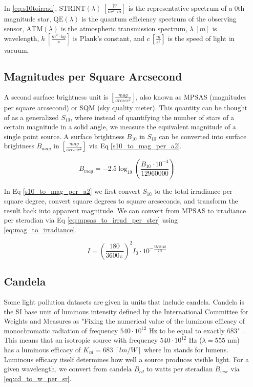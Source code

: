 In \ref{eq:s10toirrad}, $\textrm{STRINT}(\lambda) \: \left[ \frac{W}{m^2 \cdot m} \right]$ is the
representative spectrum of a 0th magnitude star, $\textrm{QE}(\lambda)$ is the quantum efficiency
spectrum of the observing sensor, $\textrm{ATM}(\lambda)$ is the atmospheric transmission spectrum, $\lambda \: [m]$ is wavelength, $h \: \left[
\frac{m^2 \cdot kg}{s} \right]$ is Plank's constant, and $c \: \left[ \frac{m}{s^2} \right]$ is the
speed of light in vacuum. 

\subsection{Magnitudes per Square Arcsecond}

A second surface brightness unit is $\left[ \frac{mag}{arcsec^2} \right]$, also known as MPSAS (magnitudes per square arcsecond) or SQM (sky quality meter). This quantity can be thought of as a generalized $S_{10}$, where instead of quantifying the number of stars of a certain
magnitude in a solid angle, we measure the equivalent magnitude of a single point source. A surface
brightness $B_{10}$ in $S_{10}$ can be converted into surface brightness $B_{mag}$ in 
$\left[ \frac{mag}{arcsec^2} \right]$ via Eq \ref{s10_to_mag_per_a2}.

\begin{equation} \label{s10_to_mag_per_a2}
	B_{mag} = -2.5 \log_{10}\left( \frac{B_{10} \cdot 10^{-4}}{12960000} \right)
\end{equation}

In Eq \ref{s10_to_mag_per_a2} we first convert $S_{10}$ to the total irradiance per square degree,
convert square degrees to square arcseconds, and transform the result back into apparent magnitude. We can convert from MPSAS to irradiance per steradian via Eq \ref{eq:mpsas_to_irrad_per_ster} using \ref{eq:mag_to_irradiance}.

\begin{equation} \label{eq:mpsas_to_irrad_per_ster}
  I = \left( \frac{180}{ 3600\pi} \right)^2 I_0 \cdot 10^{-\frac{MPSAS}{2.5}}
\end{equation}

\subsection{Candela} \label{sec:candela}

Some light pollution datasets are given in units that include candela. Candela is the SI base unit of luminous intensity defined by the International Committee for Weights and Measures as "Fixing the numerical value of the luminous efficacy of monochromatic radiation of frequency $540\cdot10^{12}$ Hz to be equal to exactly $683$" \cite{nist_units}. This means that an isotropic source with frequency $540\cdot10^{12}$ Hz ($\lambda = 555$ nm) has a luminous efficacy of $K_{cd} = 683 \: \left[ lm/W \right]$ where lm stands for lumens. Luminous efficacy itself determines how well a source produces visible light. For a given wavelength, we convert from candela $B_{cd}$ to watts per steradian $B_{wsr}$ via \ref{eq:cd_to_w_per_sr}.

